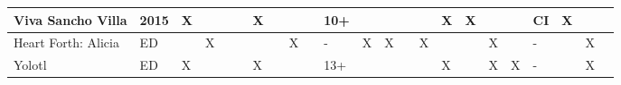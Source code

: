 \begin{table}[htbp]
{\begin{tabular}{|l|l|l|l|l|l|l|l|l|l|l|l|l|l|l|l|l|l|l|l|l|l|l|}
			Viva Sancho Villa                            & 2015                   & X          &             &        &        & X      &          &     &         & 10+  &    &      &           &          & X     & X       &          &          & CI                                          & X          &               &         \\ \hline
			Heart Forth: Alicia                          & ED                     &            & X           &        &        &        &          & X   &         & -    & X  & X    &           & X        &       &         & X        &          & -                                           &            & X             &         \\ \hline
			Yolotl                                       & ED                     & X          &             &        &        & X      &          &     &         & 13+                   &    &      &           &          & X     &         & X        & X        & -                                           &            & X             &         \\ \hline
			
		\end{tabular}
	}
\end{table}
